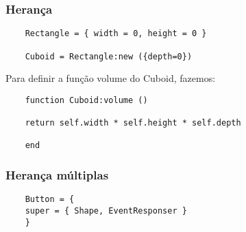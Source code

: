 \begin{frame}[fragile]
  \frametitle{Herança}
  \begin{lstlisting}
    Rectangle = { width = 0, height = 0 }

    Cuboid = Rectangle:new ({depth=0})
  \end{lstlisting}

   Para definir a função volume do Cuboid, fazemos:

  \begin{lstlisting}
    function Cuboid:volume ()

    return self.width * self.height * self.depth

    end
  \end{lstlisting}
\end{frame}

\begin{frame}[fragile]
  \frametitle{Herança múltiplas}

  \begin{lstlisting}
    Button = {
    super = { Shape, EventResponser }
    }
  \end{lstlisting}
\end{frame}
